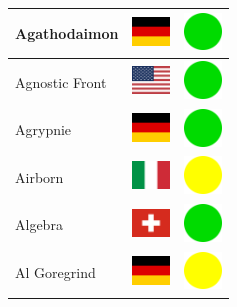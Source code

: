 \documentclass[12pt, a4paper, twoside]{report}
\begin{document}
\begin{center}
\begin{longtable}{|p{5cm}|p{2cm}|p{2cm}|}
Agathodaimon & \includegraphics[width=1cm]{4x3/de} & \includegraphics[width=1cm]{likes/y} \\ \hline
Agnostic Front & \includegraphics[width=1cm]{4x3/us} & \includegraphics[width=1cm]{likes/y} \\ \hline
Agrypnie & \includegraphics[width=1cm]{4x3/de} & \includegraphics[width=1cm]{likes/y} \\ \hline
Airborn & \includegraphics[width=1cm]{4x3/it} & \includegraphics[width=1cm]{likes/m} \\ \hline
Algebra & \includegraphics[width=1cm]{4x3/ch} & \includegraphics[width=1cm]{likes/y} \\ \hline
Al Goregrind & \includegraphics[width=1cm]{4x3/de} & \includegraphics[width=1cm]{likes/m} \\ \hline

\end{longtable}
\end{center}
\end{document}
